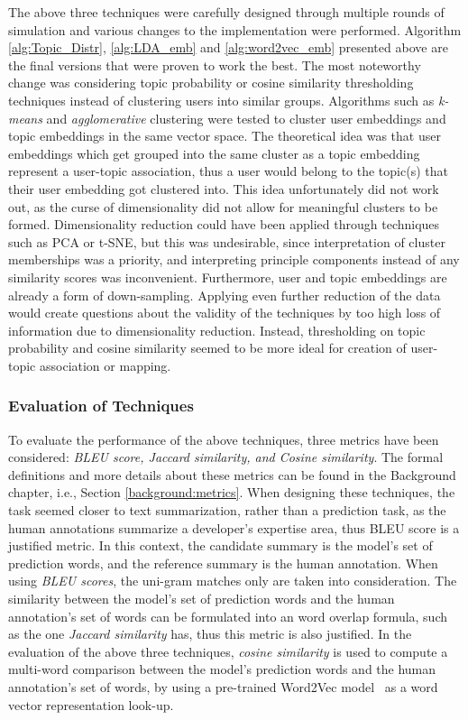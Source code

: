         The above three techniques were carefully designed through multiple rounds of simulation and various changes to the implementation were performed. Algorithm \ref{alg:Topic_Distr}, \ref{alg:LDA_emb} and \ref{alg:word2vec_emb} presented above are the final versions that were proven to work the best. The most noteworthy change was considering topic probability or cosine similarity thresholding techniques instead of clustering users into similar groups. Algorithms such as \emph{k-means} and \emph{agglomerative} clustering were tested to cluster user embeddings and topic embeddings in the same vector space. The theoretical idea was that user embeddings which get grouped into the same cluster as a topic embedding represent a user-topic association, thus a user would belong to the topic(s) that their user embedding got clustered into. This idea unfortunately did not work out, as the curse of dimensionality did not allow for meaningful clusters to be formed. Dimensionality reduction could have been applied through techniques such as PCA or t-SNE, but this was undesirable, since interpretation of cluster memberships was a priority, and interpreting principle components instead of any similarity scores was inconvenient. Furthermore, user and topic embeddings are already a form of down-sampling. Applying even further reduction of the data would create questions about the validity of the techniques by too high loss of information due to dimensionality reduction. Instead, thresholding on topic probability and cosine similarity seemed to be more ideal for creation of user-topic association or mapping.
        
       \subsubsection{Evaluation of Techniques} \label{sec:eval_expertise_prediction} 
       To evaluate the performance of the above techniques, three metrics have been considered: \emph{BLEU score, Jaccard similarity, and Cosine similarity}. The formal definitions and more details about these metrics can be found in the Background chapter, i.e., Section \ref{background:metrics}. When designing these techniques, the task seemed closer to text summarization, rather than a prediction task, as the human annotations summarize a developer's expertise area, thus BLEU score is a justified metric. In this context, the candidate summary is the model's set of prediction words, and the reference summary is the human annotation. When using \emph{BLEU scores}, the uni-gram matches only are taken into consideration. The similarity between the model's set of prediction words and the human annotation's set of words can be formulated into an word overlap formula, such as the one \emph{Jaccard similarity} has, thus this metric is also justified. In the evaluation of the above three techniques, \emph{cosine similarity} is used to compute a multi-word comparison between the model's prediction words and the human annotation's set of words, by using a pre-trained Word2Vec model~\cite{efstathiou2018word} as a word vector representation look-up.
       
